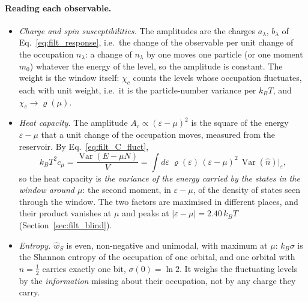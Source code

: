 \documentclass[10pt,a4paper]{article}
\theoremstyle{plain}
\theoremstyle{remark}
\newcommand{\Var}{\operatorname{Var}}
\begin{document}
\paragraph{Reading each observable.}
\begin{itemize}
\item \emph{Charge and spin susceptibilities.} The amplitudes are the charges
  $ a_\lambda $, $ b_\lambda $ of Eq.~\eqref{eq:filt_response}, i.e.\ the change of the
  observable per unit change of the occupation $ n_\lambda $: a change of $ n_\lambda $
  by one moves one particle (or one moment $ m_0 $) whatever the energy of the
  level, so the amplitude is constant. The weight is the window itself:
  $ \chi_c $ counts the levels whose occupation fluctuates, each with unit weight,
  i.e.\ it is the particle-number variance per $ k_BT $, and $ \chi_c \to \varrho(\mu) $.
\item \emph{Heat capacity.} The amplitude $ A_c \propto (\varepsilon - \mu)^{2} $ is
  the square of the energy $ \varepsilon - \mu $ that a unit change of the occupation
  moves, measured from the reservoir. By Eq.~\eqref{eq:filt_C_fluct},
  \[
    k_BT^{2}c_\mu = \frac{\Var(E - \mu N)}{V}
    = \int d\varepsilon\;\varrho(\varepsilon)\,(\varepsilon - \mu)^{2}\,\Var(\hat n)\big|_{\varepsilon} ,
  \]
  so the heat capacity is \emph{the variance of the energy carried by the states in
  the window around $ \mu $}: the second moment, in $ \varepsilon - \mu $, of the
  density of states seen through the window. The two factors are maximised in
  different places, and their product vanishes at $ \mu $ and peaks at
  $ |\varepsilon - \mu| = 2.40\,k_BT $ (Section~\ref{sec:filt_blind}).
\item \emph{Entropy.} $ \hat w_S $ is even, non-negative and unimodal, with maximum
  at $ \mu $: $ k_B\sigma $ is the Shannon entropy of the occupation of one orbital,
  and one orbital with $ n = \tfrac12 $ carries exactly one bit, $ \sigma(0) = \ln2 $.
  It weighs the fluctuating levels by the \emph{information} missing about their
  occupation, not by any charge they carry.
\end{itemize}
\end{document}
